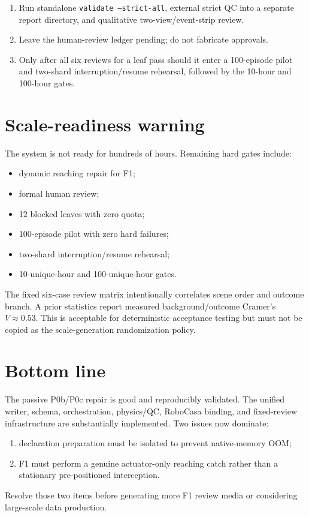 \documentclass[11pt]{article}
\begin{document}
\begin{enumerate}
        directory includes the new commit/profile.  Do not resume an ac56d64
        plan after changing generator Git identity.
  \item Run standalone \texttt{validate --strict-all}, external strict QC into
        a separate report directory, and qualitative two-view/event-strip
        review.
  \item Leave the human-review ledger pending; do not fabricate approvals.
  \item Only after all six reviews for a leaf pass should it enter a
        100-episode pilot and two-shard interruption/resume rehearsal, followed
        by the 10-hour and 100-hour gates.
\end{enumerate}

\section{Scale-readiness warning}

The system is not ready for hundreds of hours.  Remaining hard gates include:

\begin{itemize}
  \item dynamic reaching repair for F1;
  \item formal human review;
  \item 12 blocked leaves with zero quota;
  \item 100-episode pilot with zero hard failures;
  \item two-shard interruption/resume rehearsal;
  \item 10-unique-hour and 100-unique-hour gates.
\end{itemize}

The fixed six-case review matrix intentionally correlates scene order and
outcome branch.  A prior statistics report measured background/outcome
Cramer's \(V\approx0.53\).  This is acceptable for deterministic acceptance
testing but must not be copied as the scale-generation randomization policy.

\section{Bottom line}

The passive P0b/P0c repair is good and reproducibly validated.  The unified
writer, schema, orchestration, physics/QC, RoboCasa binding, and fixed-review
infrastructure are substantially implemented.  Two issues now dominate:

\begin{enumerate}
  \item declaration preparation must be isolated to prevent native-memory OOM;
  \item F1 must perform a genuine actuator-only reaching catch rather than a
        stationary pre-positioned interception.
\end{enumerate}

Resolve those two items before generating more F1 review media or considering
large-scale data production.
\end{document}
